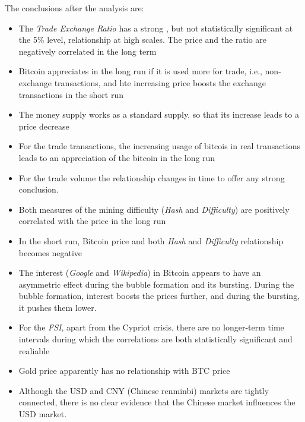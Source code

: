 The conclusions after the analysis are:
\begin{itemize}
\item The \textit{Trade Exchange Ratio} has a strong , but not
  statistically significant at the 5\% level, relationship at high
  scales. The price and the ratio are negatively correlated in the
  long term
\item Bitcoin appreciates in the long run if it is used more for
  trade, i.e., non-exchange transactions, and hte increasing price
  boosts the exchange transactions in the short run
\item The money supply works as a standard supply, so that its
  increase leads to a price decrease
\item For the trade transactions, the increasing usage of bitcois in
  real transactions leads to an appreciation of the bitcoin in the
  long run
\item For the trade volume the relationship changes in time to offer
  any strong conclusion.
\item Both measures of the mining difficulty (\textit{Hash} and
  \textit{Difficulty}) are positively correlated with the price in the
  long run
\item In the short run, Bitcoin price and both \textit{Hash} and
  \textit{Difficulty} relationship becomes negative
\item The interest (\textit{Google} and \textit{Wikipedia}) in Bitcoin
  appears to have an asymmetric effect during the bubble formation and
  its bursting. During the bubble formation, interest boosts the
  prices further, and during the bursting, it pushes them lower.
\item For the \textit{FSI}, apart from the Cypriot crisis, there are
  no longer-term time intervals during which the correlations are both
  statistically significant and realiable
\item Gold price apparently has no relationship with BTC price
\item Although the USD and CNY (Chinese renminbi) markets are tightly
  connected, there is no clear evidence that the Chinese market
  influences the USD market.
\end{itemize}

